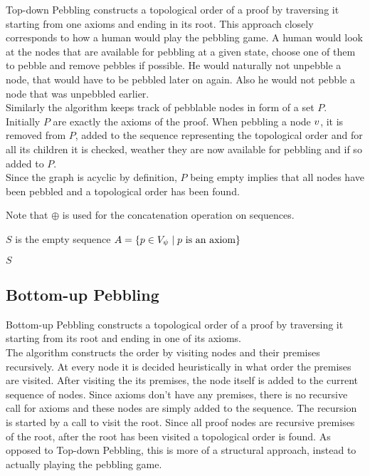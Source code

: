 \documentclass{llncs}
\begin{document}
Top-down Pebbling constructs a topological order of a proof by traversing it starting from one axioms and ending in its root.
This approach closely corresponds to how a human would play the pebbling game. 
A human would look at the nodes that are available for pebbling at a given state, choose one of them to pebble and remove pebbles if possible.
He would naturally not unpebble a node, that would have to be pebbled later on again. Also he would not pebble a node that was unpebbled earlier.\\
Similarly the algorithm keeps track of pebblable nodes in form of a set $P$. Initially $P$ are exactly the axioms of the proof. 
When pebbling a node $v$, it is removed from $P$, added to the sequence representing the topological order and for all its children it is checked, weather they are now available for pebbling and if so added to $P$.\\
Since the graph is acyclic by definition, $P$ being empty implies that all nodes have been pebbled and a topological order has been found.

Note that $\oplus$ is used for the concatenation operation on sequences. %

\begin{algorithm}[h]
	
	$S$ is the empty sequence\;
	$A = \{p \in V_{\psi} \mid p \text{ is an axiom}\}$\;
	
	
	\Return $S$\;
	
  \caption[.]{}
  \label{algo:TDpebbling}
\end{algorithm}

\subsection{Bottom-up Pebbling}

Bottom-up Pebbling constructs a topological order of a proof by traversing it starting from its root and ending in one of its axioms.\\
The algorithm constructs the order by visiting nodes and their premises recursively. 
At every node it is decided heuristically in what order the premises are visited.
After visiting the its premises, the node itself is added to the current sequence of nodes.
Since axioms don't have any premises, there is no recursive call for axioms and these nodes are simply added to the sequence.
The recursion is started by a call to visit the root.
Since all proof nodes are recursive premises of the root, after the root has been visited a topological order is found.
As opposed to Top-down Pebbling, this is more of a structural approach, instead to actually playing the pebbling game.
\end{document}
